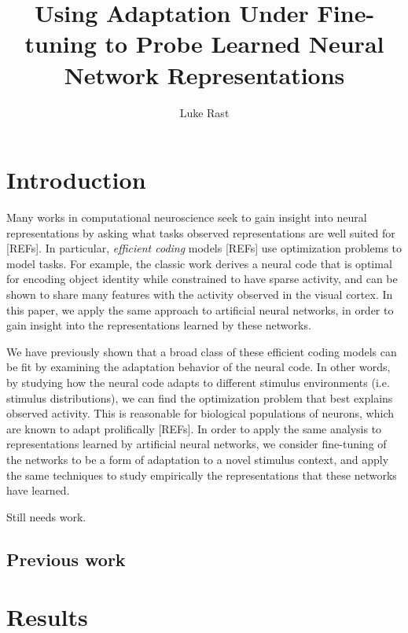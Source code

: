 \documentclass[10pt]{article}      %
\begin{document}
\title{Using Adaptation Under Fine-tuning to Probe Learned Neural Network Representations}
\author{Luke Rast}
\maketitle
\linenumbers


\section{Introduction}


Many works in computational neuroscience seek to gain insight into neural representations by asking what tasks observed representations are well suited for \cite{yamins_using_2016}[REFs].
In particular, \textit{efficient coding} models \cite{olshausen_emergence_1996,yamins_performance-optimized_2014}[REFs] use optimization problems to model tasks.
For example, the classic work \cite{olshausen_emergence_1996} derives a neural code that is optimal for encoding object identity while constrained to have sparse activity, and can be shown to share many features with the activity observed in the visual cortex.
In this paper, we apply the same approach to artificial neural networks, in order to gain insight into the representations learned by these networks.


We have previously shown \cite{rast_adaptation_2020} that a broad class of these efficient coding models can be fit by examining the adaptation behavior of the neural code. 
In other words, by studying how the neural code adapts to different stimulus environments (i.e. stimulus distributions), we can find the optimization problem that best explains observed activity.
This is reasonable for biological populations of neurons, which are known to adapt prolifically [REFs].
In order to apply the same analysis to representations learned by artificial neural networks, we consider fine-tuning of the networks to be a form of adaptation to a novel stimulus context, and apply the same techniques to study empirically the representations that these networks have learned.

Still needs work.


\subsection{Previous work}


\section{Results}
\end{document}
